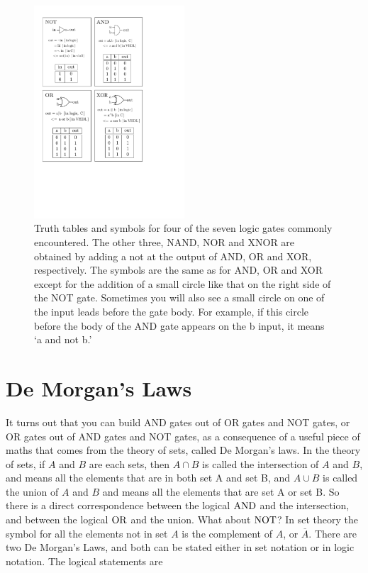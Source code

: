 \documentclass[../physical_computing.tex]{subfiles}
\begin{document}
\begin{figure}[t]
\centering
\includegraphics[width=0.5\textwidth]{chapter_1/figures/logic_gates_figure.pdf}
\caption{\label{fig:logic_gates_figure} Truth tables and symbols for four of the seven logic gates commonly encountered. The other three, NAND, NOR and XNOR are obtained by adding a not at the output of AND, OR and XOR, respectively. The symbols are the same as for AND, OR and XOR except for the addition of a small circle like that on the right side of the NOT gate. Sometimes you will also see a small circle on one of the input leads before the gate body. For example, if this circle before the body of the AND gate appears on the b input, it means `a and not b.'}
\end{figure}

\section{De Morgan's Laws}
\label{sec:demorgan}

It turns out that you can build AND gates out of OR gates and NOT gates, or OR gates out of AND gates and NOT gates, as a consequence of a useful piece of maths that comes from the theory of sets, called De Morgan's laws. In the theory of sets, if $A$ and $B$ are each sets, then $A\cap B$ is called the intersection of $A$ and $B$, and means all the elements that are in both set A and set B, and $A\cup B$ is called the union of $A$ and $B$ and means all the elements that are set A or set B. So there is a direct correspondence between the logical $\rm AND$ and the intersection, and between the logical $\rm OR$ and the union. What about $\rm NOT$? In set theory the symbol for all the elements not in set $A$ is the complement of $A$, or $\overline{A}$. There are two De Morgan's Laws, and both can be stated either in set notation or in logic notation. The logical statements are
\end{document}
